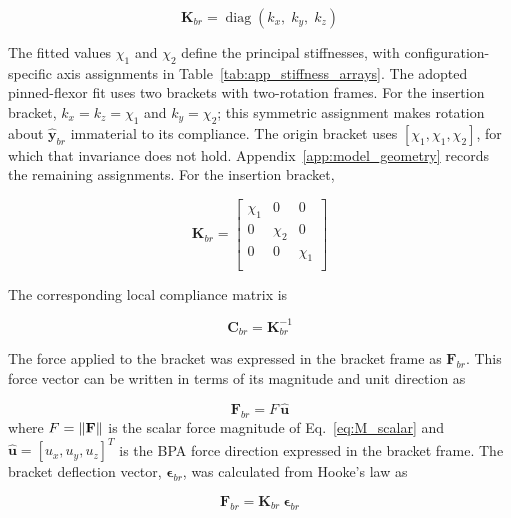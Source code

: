 \begin{equation}
\mathbf{K}_{br} = \operatorname{diag}\!\left(k_{x},\; k_{y},\; k_{z}\right)
\label{eq:bktstiffness_general}
\end{equation}

The fitted values $\chi_1$ and $\chi_2$ define the principal stiffnesses, with configuration-specific axis assignments in Table~\ref{tab:app_stiffness_arrays}. The adopted pinned-flexor fit uses two brackets with two-rotation frames. For the insertion bracket, $k_x=k_z=\chi_1$ and $k_y=\chi_2$; this symmetric assignment makes rotation about $\hat{\mathbf y}_{br}$ immaterial to its compliance. The origin bracket uses $[\chi_1,\chi_1,\chi_2]$, for which that invariance does not hold. Appendix~\ref{app:model_geometry} records the remaining assignments. For the insertion bracket,

\begin{equation}
\mathbf{K}_{br} = 
\begin{bmatrix}
\chi_{1} & 0   & 0 \\
0   & \chi_{2} & 0 \\
0   & 0   & \chi_{1} \\
\end{bmatrix}
\label{eq:bktstiffness}
\end{equation}

The corresponding local compliance matrix is 

\begin{equation}
\mathbf{C}_{br} = \mathbf{K}_{br}^{-1}
\label{eq:bktcompliance}
\end{equation}

The force applied to the bracket was expressed in the bracket frame as $\mathbf{F}_{br}$. This force vector can be written in terms of its magnitude and unit direction as

\begin{equation}
\mathbf{F}_{br} = F \, \hat{\mathbf{u}}
\label{eq:bktforcevector}
\end{equation}
\noindent
where $F = \lVert\mathbf{F}\rVert$ is the scalar force magnitude of Eq.~\eqref{eq:M_scalar} and $\hat{\mathbf{u}} = [u_{x}, u_{y}, u_{z}]^{T}$ is the BPA force direction expressed in the bracket frame. The bracket deflection vector, $\boldsymbol{\epsilon}_{br}$, was calculated from Hooke's law as 

\begin{equation} \mathbf{F}_{br} = \mathbf{K}_{br} \: \boldsymbol{\epsilon}_{br}
\label{eq:bktvectorhooke}
\end{equation}

